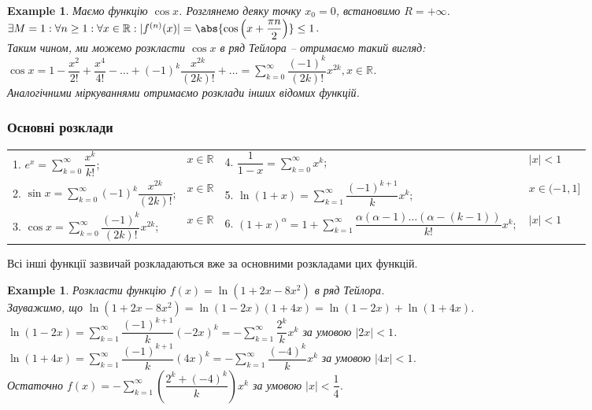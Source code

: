 \documentclass[a4paper, 10pt]{article}
\def\huge{\displaystyle}
\theoremstyle{theoremdd}
\theoremstyle{theoremdd}
\theoremstyle{theoremdd}
\theoremstyle{theoremdd}
\theoremstyle{theoremdd}
\newtheorem{example}[theorem]{Example}
\theoremstyle{theoremdd}
\theoremstyle{theoremdd}
\theoremstyle{theoremdd}
\theoremstyle{theoremdd}
\newtheorem{corollary}[theorem]{Corollary}
\begin{document}

\begin{example}
Маємо функцію $\cos x$. Розглянемо деяку точку $x_0 = 0$, встановимо $R = +\infty$.\\
$\exists M = 1: \forall n \geq 1: \forall x \in \mathbb{R}: |f^{(n)}(x)| = \abs{\cos \left( x + \dfrac{\pi n}{2} \right)} \leq 1$.\\
Таким чином, ми можемо розкласти $\cos x$ в ряд Тейлора -- отримаємо такий вигляд:\\
$\cos x = 1 - \dfrac{x^2}{2!} + \dfrac{x^4}{4!} - \dots + (-1)^k \dfrac{x^{2k}}{(2k)!} + \dots = \huge\sum_{k=0}^\infty \dfrac{(-1)^k}{(2k)!} x^{2k}, x \in \mathbb{R}$.\\
Аналогічними міркуваннями отримаємо розклади інших відомих функцій.
\end{example}

\subsubsection*{Основні розклади}
\begin{tabular}{ll|ll}
1. $e^x = \huge\sum_{k=0}^\infty \dfrac{x^k}{k!}$; & $x \in \mathbb{R}$ & 4. $\dfrac{1}{1-x} = \huge\sum_{k=0}^\infty x^k$; & $ |x| < 1$\\
2. $\sin x = \huge\sum_{k=0}^\infty (-1)^{k} \dfrac{x^{2k}}{(2k)!}$; & $x \in \mathbb{R}$ & 5. $\ln (1+x) = \huge\sum_{k=1}^\infty \dfrac{(-1)^{k+1}}{k} x^k$; & $x \in (-1,1]$\\
3. $\cos x = \huge\sum_{k=0}^\infty \dfrac{(-1)^k}{(2k)!} x^{2k}$; & $x \in \mathbb{R}$ & 6. $(1+x)^\alpha = 1 + \huge\sum_{k=1}^\infty \dfrac{\alpha (\alpha-1) \dots (\alpha - (k-1))}{k!}x^k;$ & $|x| < 1$
\end{tabular}

Всі інші функції зазвичай розкладаються вже за основними розкладами цих функцій.

\begin{example}
Розкласти функцію $f(x) = \ln (1+2x-8x^2)$ в ряд Тейлора.\\
Зауважимо, що $\ln (1+2x-8x^2) = \ln (1-2x)(1+4x) = \ln (1-2x) + \ln (1+4x)$.\\
$\ln (1-2x) =  \huge\sum_{k=1}^\infty \dfrac{(-1)^{k+1}}{k}(-2x)^k =- \sum_{k=1}^\infty \dfrac{2^k}{k}x^k$ за умовою $|2x| < 1$.\\
$\ln (1+4x) = \huge\sum_{k=1}^\infty \dfrac{(-1)^{k+1}}{k} (4x)^k = -\sum_{k=1}^\infty \dfrac{(-4)^k}{k}x^k$ за умовою $|4x| < 1$.\\
Остаточно $f(x) = -\huge\sum_{k=1}^\infty \left( \dfrac{2^k+(-4)^k}{k} \right) x^k$ за умовою $|x| < \dfrac{1}{4}$.
\end{example}
\newpage
\end{document}
